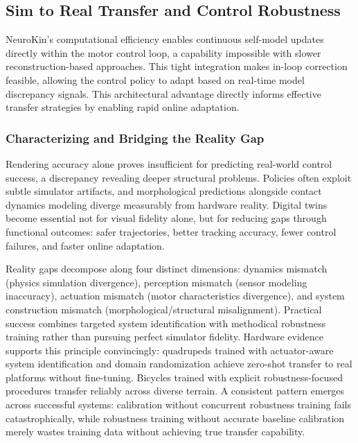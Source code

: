 ﻿\documentclass[11pt,a4paper]{article}
\begin{document}
\subsection{Sim to Real Transfer and Control Robustness}

NeuroKin's computational efficiency enables continuous self-model updates directly within the motor control loop, a capability impossible with slower reconstruction-based approaches. This tight integration makes in-loop correction feasible, allowing the control policy to adapt based on real-time model discrepancy signals. This architectural advantage directly informs effective transfer strategies by enabling rapid online adaptation.

\subsubsection{Characterizing and Bridging the Reality Gap}

Rendering accuracy alone proves insufficient for predicting real-world control success, a discrepancy revealing deeper structural problems. Policies often exploit subtle simulator artifacts, and morphological predictions alongside contact dynamics modeling diverge measurably from hardware reality. Digital twins become essential not for visual fidelity alone, but for reducing gaps through functional outcomes: safer trajectories, better tracking accuracy, fewer control failures, and faster online adaptation.

Reality gaps decompose along four distinct dimensions: dynamics mismatch (physics simulation divergence), perception mismatch (sensor modeling inaccuracy), actuation mismatch (motor characteristics divergence), and system construction mismatch (morphological/structural misalignment). Practical success combines targeted system identification with methodical robustness training rather than pursuing perfect simulator fidelity. Hardware evidence supports this principle convincingly: quadrupeds trained with actuator-aware system identification and domain randomization achieve zero-shot transfer to real platforms without fine-tuning. Bicycles trained with explicit robustness-focused procedures transfer reliably across diverse terrain. A consistent pattern emerges across successful systems: calibration without concurrent robustness training fails catastrophically, while robustness training without accurate baseline calibration merely wastes training data without achieving true transfer capability.
\end{document}
